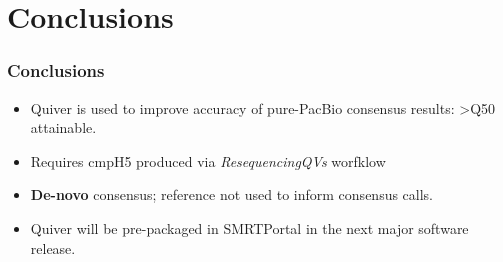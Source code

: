 \documentclass[11pt,serif]{beamer}
\begin{document}
\section{Conclusions}
\label{sec-5}
\begin{frame}[fragile]\frametitle{Conclusions}
\label{sec-5-1}

\begin{itemize}
\item Quiver is used to improve accuracy of pure-PacBio consensus
     results: >Q50 attainable.
\item Requires cmpH5 produced via \emph{ResequencingQVs} worfklow
\item \textbf{De-novo} consensus; reference not used to inform consensus
     calls.
\item Quiver will be pre-packaged in SMRTPortal in the next major
     software release.
\end{itemize}
\end{frame}
\end{document}
